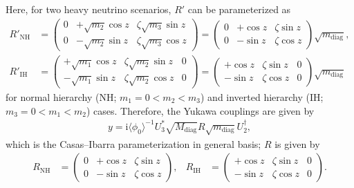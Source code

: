 \documentclass[a4paper,11pt]{scrartcl}
\numberwithin{equation}{section}
\newcommand\w[1]{_{\mathrm{#1}}}
\newcommand\ii{\mathrm{i}}
\newcommand\vev[1]{\langle#1\rangle}
\newcommand\YN{y}
\begin{document}
Here, for two heavy neutrino scenarios, $R'$ can be parameterized as
\begin{align}
R'\w{NH} &= \begin{pmatrix}
0 & +\sqrt{m_2}\cos z  & \zeta\sqrt{m_3}\sin z\\
0 & -\sqrt{m_2}\sin{z} & \zeta\sqrt{m_3}\cos z
\end{pmatrix}
=
\begin{pmatrix}
0 & +\cos z  & \zeta\sin z\\
0 & -\sin{z} & \zeta\cos z
\end{pmatrix}\sqrt{m\w{diag}},
\\
R'\w{IH} &= \begin{pmatrix}
+\sqrt{m_1}\cos z  & \zeta\sqrt{m_2}\sin z & 0\\
-\sqrt{m_1}\sin{z} & \zeta\sqrt{m_2}\cos z & 0
\end{pmatrix}
=
\begin{pmatrix}
+\cos z  & \zeta\sin z & 0\\
-\sin{z} & \zeta\cos z & 0
\end{pmatrix}\sqrt{m\w{diag}}
\end{align}
for normal hierarchy (NH; $m_1=0<m_2<m_3$) and inverted hierarchy (IH; $m_3=0<m_1<m_2$) cases.
Therefore, the Yukawa couplings are given by
\begin{align}
 \YN = \ii\vev{\phi_0}^{-1}U_3^* \sqrt{M\w{diag}}R\sqrt{m\w{diag}}U_2^\dagger,
\end{align}
which is the Casas--Ibarra parameterization in general basis; $R$ is given by
\begin{align}
R\w{NH} &= \begin{pmatrix}
0 & +\cos z  & \zeta\sin z\\
0 & -\sin{z} & \zeta\cos z
\end{pmatrix},
&
R\w{IH} &=
\begin{pmatrix}
+\cos z  & \zeta\sin z & 0\\
-\sin{z} & \zeta\cos z & 0
\end{pmatrix}.
\end{align}
\end{document}
